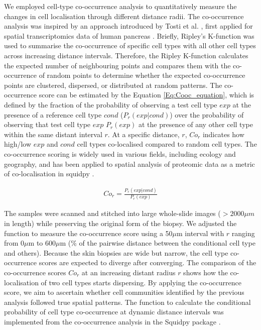 We employed cell-type co-occurrence analysis to quantitatively measure the changes in cell localisation through different distance radii. The co-occurrence analysis was inspired by an approach introduced by Tosti et al. \cite{tosti2021single}, first applied for spatial transcriptomics data of human pancreas \cite{tosti2021single}. Briefly, Ripley's K-function was used to summarise the co-occurrence of specific cell types with all other cell types across increasing distance intervals. Therefore, the Ripley K-function calculates the expected number of neighbouring points and compares them with the co-occurrence of random points to determine whether the expected co-occurrence points are clustered, dispersed, or distributed at random patterns. The co-occurrence score can be estimated by the Equation \ref{Eq:Cooc_equation}, which is defined by the fraction of the probability of observing a test cell type $exp$ at the presence of a reference cell type $cond$ ($P_{r}(exp|cond)$) over the probability of observing that test cell type $exp$ $P_{r}(exp)$ at the presence of any other cell type within the same distant interval $r$. At a specific distance, $r$, $Co_{r}$ indicates how high/low $exp$ and $cond$ cell types co-localised compared to random cell types. The co-occurrence scoring is widely used in various fields, including ecology and geography, and has been applied to spatial analysis of proteomic data as a metric of co-localisation in squidpy \cite{palla2022squidpy}. 

\begin{align}
\label{Eq:Cooc_equation}
Co_{r} = \frac{P_{r}(exp|cond)}{P_{r}(exp)} 
\end{align}

 The samples were scanned and stitched into large whole-slide images ($>2000 \mu m$ in length) while preserving the original form of the biopsy. We adjusted the function to measure the co-occurrence score using a 50$\mu$m interval with $r$ ranging from 0$\mu$m to 600$\mu$m (\% of the pairwise distance between the conditional cell type and others). Because the skin biopsies are wide but narrow, the cell type co-occurrence scores are expected to diverge after converging. The comparison of the co-occurrence scores $Co_{r}$ at an increasing distant radius $r$ shows how the co-localisation of two cell types starts dispersing. By applying the co-occurrence score, we aim to ascertain whether cell communities identified by the previous analysis followed true spatial patterns. The function to calculate the conditional probability of cell type co-occurrence at dynamic distance intervals was implemented from the co-occurrence analysis in the Squidpy package \cite{palla2022squidpy}.

